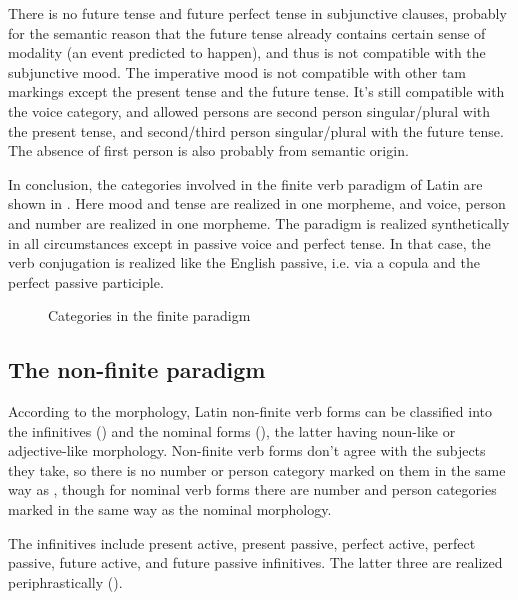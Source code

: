 \documentclass[a4paper, oneside, 12pt]{report}
\begin{document}
There is no \acl{future} tense and \acl{future perfect} tense in subjunctive clauses,
probably for the semantic reason
that the future tense already contains certain sense of modality
(an event predicted to happen),
and thus is not compatible with the \acl{subjunctive} mood.
The \acl{imperative} mood is not compatible with other \ac{tam} markings
except the \acl{present} tense and the \acl{future} tense.
It's still compatible with the voice category,
and allowed persons are 
second person singular/plural with the \acl{present} tense,
and second/third person singular/plural with the \acl{future} tense.
The absence of first person is also probably from semantic origin.

In conclusion, the categories involved in the finite verb paradigm of Latin 
are shown in .
Here mood and tense are realized in one morpheme,
and voice, person and number are realized in one morpheme.
The paradigm is realized synthetically in all circumstances 
except in passive voice and perfect tense.
In that case, the verb conjugation is realized like the English passive,
i.e. via a copula and the perfect passive participle.

\begin{figure}[H]
    \centering
    
    \caption{Categories in the finite paradigm}
    \label{fig:paradigm-finite-verb}
\end{figure}


\subsection{The non-finite paradigm}\label{sec:non-finite-abs}

According to the morphology,
Latin non-finite verb forms can be classified into the infinitives ()
and the nominal forms (),
the latter having noun-like or adjective-like morphology.
Non-finite verb forms don't agree with the subjects they take,
so there is no number or person category marked on them in the same way as ,
though for nominal verb forms there are number and person categories 
marked in the same way as the nominal morphology.

The infinitives include present active, present passive, perfect active, 
perfect passive, future active, and future passive infinitives.
The latter three are realized periphrastically ().
\end{document}
